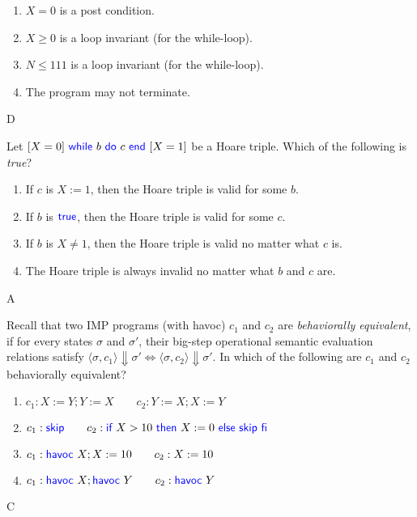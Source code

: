 \documentclass[11pt,a4paper]{article}
\newcommand{\pair}[1]{\langle #1 \rangle}
\newcommand{\evalC}[3]{\pair{#1, #2} \Downarrow #3}
\newcommand{\kword}[1]{{\color{blue} \textsf{#1}}}
\newcommand{\True}{\kword{true}}
\newcommand{\Skip}{\kword{skip}}
\newcommand{\If}{\kword{if}}
\newcommand{\Then}{\kword{then}}
\newcommand{\Else}{\kword{else}}
\newcommand{\Fi}{\kword{fi}}
\newcommand{\While}{\kword{while}}
\newcommand{\Do}{\kword{do}}
\newcommand{\End}{\kword{end}}
\newcommand{\Havoc}{\kword{havoc}}
\begin{document}
\begin{enumerate}[label=(\Alph*)]
    \item $X=0$ is a post condition.
    \item $X \ge 0$ is a loop invariant (for the while-loop).
    \item $N \le 111$ is a loop invariant (for the while-loop).
    \item The program may not terminate.
\end{enumerate}

\begin{solution}
    D
\end{solution}

\subproblem Let $[X=0]~\While~b~\Do~c~\End~[X=1]$ be a Hoare triple.
Which of the following is \emph{true}?

\begin{enumerate}[label=(\Alph*)]
    \item If $c$ is $X:=1$, then the Hoare triple is valid for some $b$.
    \item If $b$ is $\True$, then the Hoare triple is valid for some $c$.
    \item If $b$ is $X\not=1$, then the Hoare triple is valid no matter what $c$ is.
    \item The Hoare triple is always invalid no matter what $b$ and $c$ are.
\end{enumerate}

\begin{solution}
    A
\end{solution}

\subproblem Recall that two IMP programs (with havoc) $c_1$ and $c_2$ are \emph{behaviorally equivalent},
if for every states $\sigma$ and $\sigma'$, their big-step operational semantic evaluation relations satisfy $\evalC{\sigma}{c_1}{\sigma'} \iff \evalC{\sigma}{c_2}{\sigma'}$.
In which of the following are $c_1$ and $c_2$ behaviorally equivalent?

\begin{enumerate}[label=(\Alph*)]
    \item $c_1: X:=Y; Y:=X \qquad c_2: Y:=X; X:=Y$
    \item $c_1: \Skip \qquad c_2: \If~X>10~\Then~X:=0~\Else~\Skip~\Fi$
    \item $c_1: \Havoc~X; X:=10 \qquad c_2: X:=10$
    \item $c_1: \Havoc~X; \Havoc~Y \qquad c_2: \Havoc~Y$
\end{enumerate}

\begin{solution}
   C
\end{solution}
\end{document}
